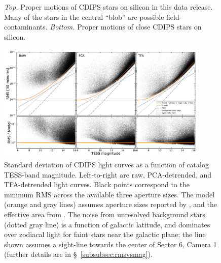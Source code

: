 \documentclass[12pt,twocolumn,tighten]{aastex62}
\begin{document}
\begin{figure}[!t]
	\vspace{-0.9cm}
	\vspace{-0.9cm}
	\caption{
		{\it Top.} Proper motions of CDIPS stars on silicon in this
		data release.  Many of the stars in the central ``blob'' are possible
		field-contaminants.
		{\it Bottom.} Proper motions of close CDIPS stars
		on silicon.
	}
	\label{fig:propermotions}
\end{figure}

\begin{figure}[!t]
	\begin{center}
		\leavevmode
		\includegraphics[width=0.9\textwidth]{IRM-PCA-TFA_rms_vs_mag.pdf}
	\end{center}
	\vspace{-0.5cm}
	\caption{
    Standard deviation of CDIPS light curves as a function of catalog
    TESS-band magnitude.  Left-to-right are raw, PCA-detrended, and
    TFA-detrended light curves. Black points correspond to the minimum
    RMS across the available three aperture sizes.  The model (orange
    and gray lines) assumes aperture sizes reported by
    \citet{Sullivan_et_al_2015}, and the effective area from
    \citet{vanderspek_2018}.  The noise from unresolved background
    stars (dotted gray line) is a function of galactic latitude, and
    dominates over zodiacal light for faint stars near the galactic
    plane; the line shown assumes a sight-line towards the center of
    Sector 6, Camera 1 (further details are in
    \S~\ref{subsubsec:rmsvsmag}).
		\label{fig:rms_vs_mag}
	}
\end{figure}
\end{document}
